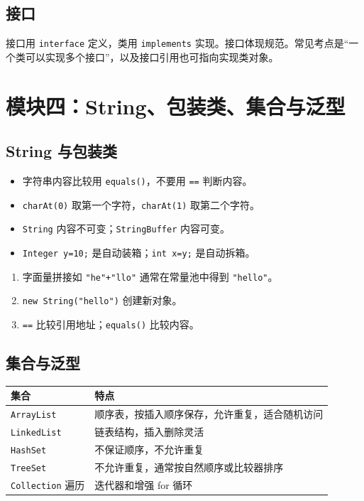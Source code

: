 \documentclass[UTF8,zihao=-4]{ctexart}
\begin{document}
\subsection{接口}
\begin{keybox}[接口]
接口用 \texttt{interface} 定义，类用 \texttt{implements} 实现。接口体现规范。常见考点是“一个类可以实现多个接口”，以及接口引用也可指向实现类对象。
\end{keybox}

\section{模块四：String、包装类、集合与泛型}

\subsection{String 与包装类}
\begin{keybox}[String 常考]
\begin{itemize}
  \item 字符串内容比较用 \texttt{equals()}，不要用 \texttt{==} 判断内容。
  \item \texttt{charAt(0)} 取第一个字符，\texttt{charAt(1)} 取第二个字符。
  \item \texttt{String} 内容不可变；\texttt{StringBuffer} 内容可变。
  \item \texttt{Integer y=10;} 是自动装箱；\texttt{int x=y;} 是自动拆箱。
\end{itemize}
\end{keybox}

\begin{methodbox}
\begin{enumerate}
  \item 字面量拼接如 \texttt{"he"+"llo"} 通常在常量池中得到 \texttt{"hello"}。
  \item \texttt{new String("hello")} 创建新对象。
  \item \texttt{==} 比较引用地址；\texttt{equals()} 比较内容。
\end{enumerate}
\end{methodbox}

\subsection{集合与泛型}
\begin{longtable}{p{}p{}}
\toprule
\textbf{集合} & \textbf{特点} \\
\midrule
\texttt{ArrayList} & 顺序表，按插入顺序保存，允许重复，适合随机访问 \\
\texttt{LinkedList} & 链表结构，插入删除灵活 \\
\texttt{HashSet} & 不保证顺序，不允许重复 \\
\texttt{TreeSet} & 不允许重复，通常按自然顺序或比较器排序 \\
\texttt{Collection} 遍历 & 迭代器和增强 for 循环 \\
\bottomrule
\end{longtable}
\end{document}
